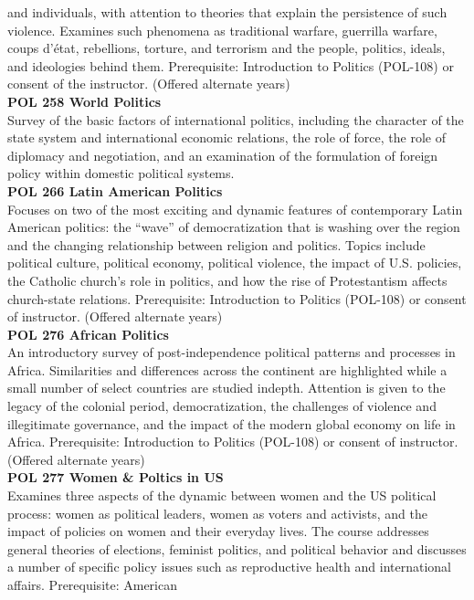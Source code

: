 \documentclass[
  letterpaper,
]{scrbook}
\begin{document}
and individuals, with attention to theories that explain the persistence
of such violence. Examines such phenomena as traditional warfare,
guerrilla warfare, coups d'état, rebellions, torture, and terrorism and
the people, politics, ideals, and ideologies behind them. Prerequisite:
Introduction to Politics (POL-108) or consent of the instructor.
(Offered alternate years)\\
\textbf{POL 258 World Politics}\\
Survey of the basic factors of international politics, including the
character of the state system and international economic relations, the
role of force, the role of diplomacy and negotiation, and an examination
of the formulation of foreign policy within domestic political
systems.\\
\textbf{POL 266 Latin American Politics}\\
Focuses on two of the most exciting and dynamic features of contemporary
Latin American politics: the ``wave'' of democratization that is washing
over the region and the changing relationship between religion and
politics. Topics include political culture, political economy, political
violence, the impact of U.S. policies, the Catholic church's role in
politics, and how the rise of Protestantism affects church-state
relations. Prerequisite: Introduction to Politics (POL-108) or consent
of instructor. (Offered alternate years)\\
\textbf{POL 276 African Politics}\\
An introductory survey of post-independence political patterns and
processes in Africa. Similarities and differences across the continent
are highlighted while a small number of select countries are studied
indepth. Attention is given to the legacy of the colonial period,
democratization, the challenges of violence and illegitimate governance,
and the impact of the modern global economy on life in Africa.
Prerequisite: Introduction to Politics (POL-108) or consent of
instructor. (Offered alternate years)\\
\textbf{POL 277 Women \& Poltics in US}\\
Examines three aspects of the dynamic between women and the US political
process: women as political leaders, women as voters and activists, and
the impact of policies on women and their everyday lives. The course
addresses general theories of elections, feminist politics, and
political behavior and discusses a number of specific policy issues such
as reproductive health and international affairs. Prerequisite: American
\end{document}
